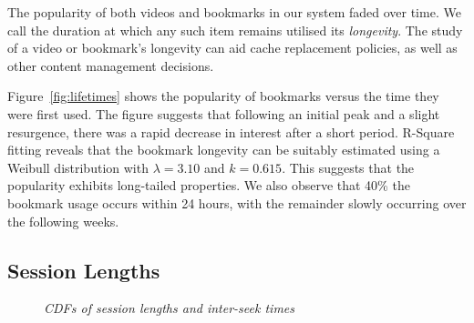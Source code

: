 \documentclass[a4paper,11pt]{article}
\newcommand{\capttext}{\protect\centering\em}
\begin{document}
The popularity of both videos and bookmarks in our system faded over time. We call the duration at which any such item remains utilised its \emph{longevity}. The study of a video or bookmark's longevity can aid cache replacement policies, as well as other content management decisions.

Figure~\ref{fig:lifetimes} shows the popularity of bookmarks versus the time they were first used. The figure suggests that following an initial peak and a slight resurgence, there was a rapid decrease in interest after a short period. R-Square fitting reveals that the bookmark longevity can be suitably estimated using a Weibull distribution with $\lambda=3.10$ and $k=0.615$. This suggests that the popularity exhibits long-tailed properties. We also observe that 40\% the bookmark usage occurs within 24 hours, with the remainder slowly occurring over the following weeks.

\subsection{Session Lengths}

\begin{figure}[tbp]
    \centering


    \caption{\capttext CDFs of session lengths and inter-seek times}
    \label{fig:view_user_sessions}
\end{figure}
\end{document}

